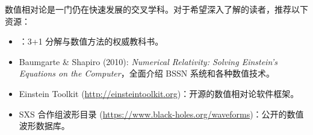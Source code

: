 \begin{note}[进一步阅读]
数值相对论是一门仍在快速发展的交叉学科。对于希望深入了解的读者，推荐以下资源：
\begin{itemize}
    \item \cite{Gourgoulhon2007}：3+1 分解与数值方法的权威教科书。
    \item Baumgarte \& Shapiro (2010): \textit{Numerical Relativity: Solving Einstein's Equations on the Computer}，全面介绍 BSSN 系统和各种数值技术。
    \item Einstein Toolkit (\url{http://einsteintoolkit.org})：开源的数值相对论软件框架。
    \item SXS 合作组波形目录 (\url{https://www.black-holes.org/waveforms})：公开的数值波形数据库。
\end{itemize}
\end{note}
